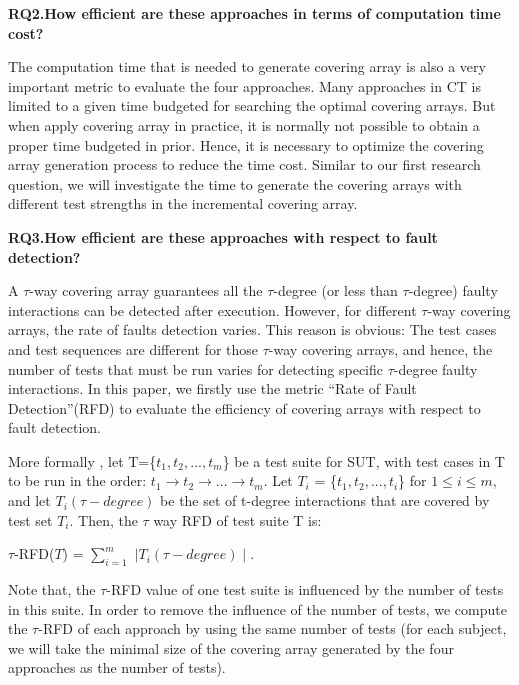 \documentclass[conference]{IEEEtran}
\theoremstyle{definition}
\begin{document}
\textbf{RQ2.How efficient are these approaches in terms of computation time cost?}

The computation time that is needed to generate covering array is also a very important metric to evaluate the four approaches. Many approaches in CT is limited to a given time budgeted for searching the optimal covering arrays.  But when apply covering array in practice, it is normally not possible to obtain a proper time budgeted in prior. Hence, it is necessary to optimize the covering array generation process to reduce the time cost. Similar to our first research question, we will investigate the time to generate the covering arrays with different test strengths in the incremental covering array.

\textbf{RQ3.How efficient are these approaches with respect to fault detection?}

A $\tau$-way covering array guarantees all the $\tau$-degree (or less than $\tau$-degree) faulty interactions can be detected after execution. However, for different $\tau$-way covering arrays, the rate of faults detection varies.  This reason is obvious: The test cases and test sequences are different for those $\tau$-way covering arrays, and hence, the number of tests that must be run varies for detecting specific $\tau$-degree faulty interactions. In this paper, we firstly use the metric ``Rate of Fault Detection''(RFD) \cite{nie2015combinatorial} to evaluate the efficiency of covering arrays with respect to fault detection.

More formally \cite{nie2015combinatorial}, let T=\{$t_{1}, t_{2}, ... , t_{m}$\} be a test suite for SUT, with test cases in T to be run in the order: $t_{1} \rightarrow t_{2} \rightarrow ... \rightarrow t_{m}$. Let $T_{i}$ = \{$t_{1}, t_{2}, ... , t_{i}$\} for $1 \leq i \leq m$,  and let $T_{i}(\tau - degree)$ be the set of t-degree interactions that are covered by test set $T_{i}$. Then,
the $\tau$ way RFD of test suite T is:

$\tau$-RFD($T$) = $\sum_{i=1}^{m}$ $ \mid T_{i}(\tau - degree) \mid$.

Note that, the $\tau$-RFD value of one test suite is influenced by the number of tests in this suite. In order to remove the influence of the number of tests, we compute the $\tau$-RFD of each approach by using the same number of tests (for each subject, we will take the minimal size of the covering array generated by the four approaches as the number of tests).
%
\end{document}
